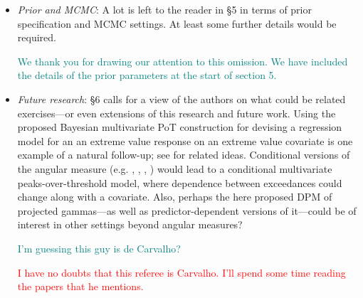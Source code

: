 \documentclass[10pt]{article}
\newcommand{\comment}[1]{\textcolor{teal}{#1}}
\newcommand{\bruno}[1]{\textcolor{red}{#1}}
\begin{document}
\begin{itemize}
\item \emph{Prior and MCMC}: A lot is left to the reader in §5 in terms of
    prior specification and MCMC settings.  At least some further details would 
    be required.

    \comment{We thank you for drawing our attention to this omission.  We have included the
    details of the prior parameters at the start of section 5.}

    

\item \emph{Future research}: §6 calls for a view of the authors on what 
    could be related exercises—or even extensions of this research and future 
    work. Using the proposed Bayesian multivariate PoT construction for 
    devising a regression model for an an extreme value response on an extreme 
    value covariate is one example of a natural follow-up; see 
    \cite{carvalho2022} for related ideas. Conditional versions of the angular 
    measure (e.g. \cite{carvalho2016}, \cite{castro2018}, \cite{escobar2018}, 
    \cite{mhalla2019}) would lead to a conditional multivariate 
    peaks-over-threshold model, where dependence between exceedances could 
    change along with a covariate. Also, perhaps the here proposed DPM of 
    projected gammas—as well as predictor-dependent versions of it—could be of 
    interest in other settings beyond angular measures?

    \comment{I'm guessing this guy is de Carvalho?}
    
    \bruno{I have no doubts that this referee is Carvalho. I'll spend some time 
    reading the papers that he mentions.}
    
\end{itemize}
\end{document}
